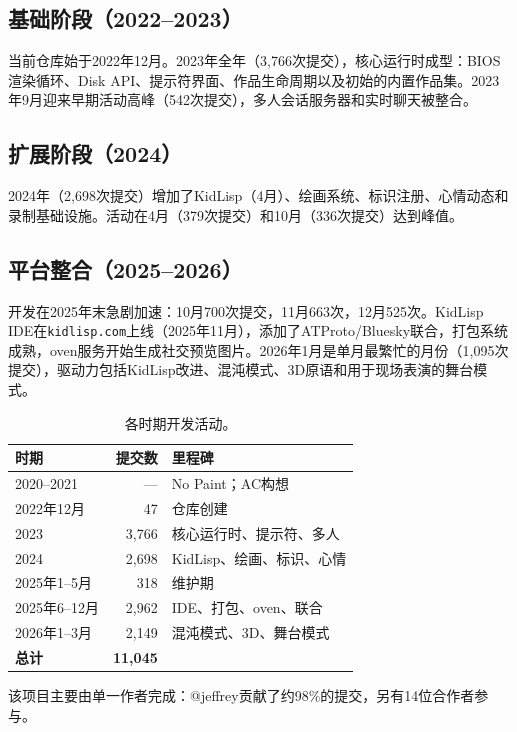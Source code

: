 \documentclass[10pt,letterpaper,twocolumn]{article}
\begin{document}
\subsection{基础阶段（2022--2023）}

当前仓库始于2022年12月。2023年全年（3,766次提交），核心运行时成型：BIOS渲染循环、Disk API、提示符界面、作品生命周期以及初始的内置作品集。2023年9月迎来早期活动高峰（542次提交），多人会话服务器和实时聊天被整合。

\subsection{扩展阶段（2024）}

2024年（2,698次提交）增加了KidLisp（4月）、绘画系统、标识注册、心情动态和录制基础设施。活动在4月（379次提交）和10月（336次提交）达到峰值。

\subsection{平台整合（2025--2026）}

开发在2025年末急剧加速：10月700次提交，11月663次，12月525次。KidLisp IDE在\texttt{kidlisp.com}上线（2025年11月），添加了ATProto/Bluesky联合，打包系统成熟，oven服务开始生成社交预览图片。2026年1月是单月最繁忙的月份（1,095次提交），驱动力包括KidLisp改进、混沌模式、3D原语和用于现场表演的舞台模式。

\begin{table}[h]
\small
\centering
\begin{tabular}{lrl}
\toprule
\textbf{时期} & \textbf{提交数} & \textbf{里程碑} \\
\midrule
2020--2021 & --- & No Paint；AC构想 \\
2022年12月 & 47 & 仓库创建 \\
2023 & 3{,}766 & 核心运行时、提示符、多人 \\
2024 & 2{,}698 & KidLisp、绘画、标识、心情 \\
2025年1--5月 & 318 & 维护期 \\
2025年6--12月 & 2{,}962 & IDE、打包、oven、联合 \\
2026年1--3月 & 2{,}149 & 混沌模式、3D、舞台模式 \\
\midrule
\textbf{总计} & \textbf{11{,}045} & \\
\bottomrule
\end{tabular}
\caption{各时期开发活动。}
\label{tab:history}
\end{table}

该项目主要由单一作者完成：@jeffrey贡献了约98\%的提交，另有14位合作者参与。
\end{document}
